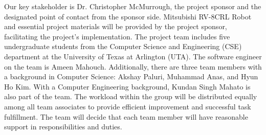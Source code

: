 Our key stakeholder is Dr. Christopher McMurrough, the project sponsor and the designated point of contact from the sponsor side. Mitsubishi RV-8CRL Robot and essential project materials will be provided by the project sponsor, facilitating the project's implementation. The project team includes five undergraduate students from the Computer Science and Engineering (CSE) department at the University of Texas at Arlington (UTA). The software engineer on the team is Ameen Mahouch. Additionally, there are three team members with a background in Computer Science: Akshay Paluri, Muhammad Anas, and Hyun Ho Kim. With a Computer Engineering background, Kundan Singh Mahato is also part of the team. The workload within the group will be distributed equally among all team associates to provide efficient improvement and successful task fulfillment. The team will decide that each team member will have reasonable support in responsibilities and duties.